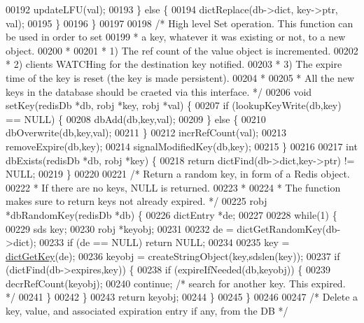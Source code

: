 \begin{DoxyCode}
00192         updateLFU(val);
00193     \} \textcolor{keywordflow}{else} \{
00194         dictReplace(db->dict, key->ptr, val);
00195     \}
00196 \}
00197 
00198 \textcolor{comment}{/* High level Set operation. This function can be used in order to set}
00199 \textcolor{comment}{ * a key, whatever it was existing or not, to a new object.}
00200 \textcolor{comment}{ *}
00201 \textcolor{comment}{ * 1) The ref count of the value object is incremented.}
00202 \textcolor{comment}{ * 2) clients WATCHing for the destination key notified.}
00203 \textcolor{comment}{ * 3) The expire time of the key is reset (the key is made persistent).}
00204 \textcolor{comment}{ *}
00205 \textcolor{comment}{ * All the new keys in the database should be craeted via this interface. */}
00206 \textcolor{keywordtype}{void} setKey(redisDb *db, robj *key, robj *val) \{
00207     \textcolor{keywordflow}{if} (lookupKeyWrite(db,key) == NULL) \{
00208         dbAdd(db,key,val);
00209     \} \textcolor{keywordflow}{else} \{
00210         dbOverwrite(db,key,val);
00211     \}
00212     incrRefCount(val);
00213     removeExpire(db,key);
00214     signalModifiedKey(db,key);
00215 \}
00216 
00217 \textcolor{keywordtype}{int} dbExists(redisDb *db, robj *key) \{
00218     \textcolor{keywordflow}{return} dictFind(db->dict,key->ptr) != NULL;
00219 \}
00220 
00221 \textcolor{comment}{/* Return a random key, in form of a Redis object.}
00222 \textcolor{comment}{ * If there are no keys, NULL is returned.}
00223 \textcolor{comment}{ *}
00224 \textcolor{comment}{ * The function makes sure to return keys not already expired. */}
00225 robj *dbRandomKey(redisDb *db) \{
00226     dictEntry *de;
00227 
00228     \textcolor{keywordflow}{while}(1) \{
00229         sds key;
00230         robj *keyobj;
00231 
00232         de = dictGetRandomKey(db->dict);
00233         \textcolor{keywordflow}{if} (de == NULL) \textcolor{keywordflow}{return} NULL;
00234 
00235         key = \hyperlink{dict_8h_a3271c334309904a3086deca94f96e46e}{dictGetKey}(de);
00236         keyobj = createStringObject(key,sdslen(key));
00237         \textcolor{keywordflow}{if} (dictFind(db->expires,key)) \{
00238             \textcolor{keywordflow}{if} (expireIfNeeded(db,keyobj)) \{
00239                 decrRefCount(keyobj);
00240                 \textcolor{keywordflow}{continue}; \textcolor{comment}{/* search for another key. This expired. */}
00241             \}
00242         \}
00243         \textcolor{keywordflow}{return} keyobj;
00244     \}
00245 \}
00246 
00247 \textcolor{comment}{/* Delete a key, value, and associated expiration entry if any, from the DB */}

\end{DoxyCode}
